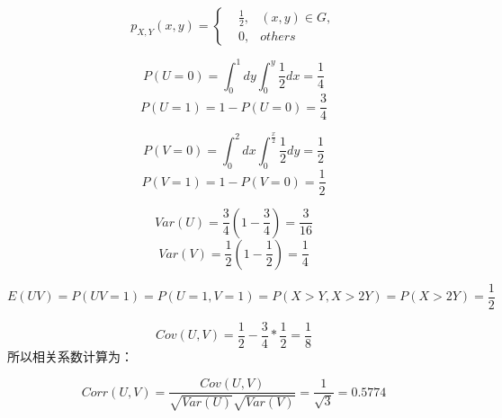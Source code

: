 \documentclass{article}
\begin{document}
\begin{equation}
p_{X,Y}(x,y)=\left\{
\begin{aligned}
&\frac12,&(x,y)\in G,\\
&0,&others
\end{aligned}
\right.
\end{equation}

$$P(U=0)=\int^1_0dy\int^y_0\frac12dx=\frac14$$
$$P(U=1)=1-P(U=0)=\frac34$$


$$P(V=0)=\int^2_0dx\int^{\frac x2}_0\frac12dy=\frac12$$
$$P(V=1)=1-P(V=0)=\frac12$$

$$Var(U)=\frac34(1-\frac34)=\frac3{16}$$
$$Var(V)=\frac12(1-\frac12)=\frac14$$

$$E(UV)=P(UV=1)=P(U=1,V=1)=P(X>Y,X>2Y)=P(X>2Y)=\frac12$$

$$Cov(U,V)=\frac12-\frac34*\frac12=\frac18$$
所以相关系数计算为：


$$Corr(U,V)=\frac{Cov(U,V)}{\sqrt{Var(U)}\sqrt{Var(V)}}=\frac1{\sqrt 3}=0.5774$$
\end{document}
